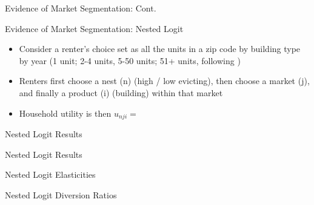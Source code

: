 \documentclass[10pt, xcolor=dvipsnames]{beamer}
\begin{document}
\begin{frame}{Evidence of Market Segmentation: Cont.}
    
\end{frame}

\begin{frame}{Evidence of Market Segmentation: Nested Logit}
    \begin{itemize}
        \item Consider a renter's choice set as all the units in a zip code by building type by year (1 unit; 2-4 units, 5-50 units; 51+ units, following \cite{framoutar2024market, calderwang2024algorithmic})
        \item Renters first choose a nest (n) (high / low evicting), then choose a market (j), and finally a product (i) (building) within that market
        \item Household utility is then $u_{nji} = $
    \end{itemize}
    
\end{frame}

\begin{frame}{Nested Logit Results}
    
\end{frame}

\begin{frame}{Nested Logit Results}

\end{frame}

\begin{frame}{Nested Logit Elasticities}
    
\end{frame}

\begin{frame}{Nested Logit Diversion Ratios}

\end{frame}

    

    

    

    
    
\end{document}
